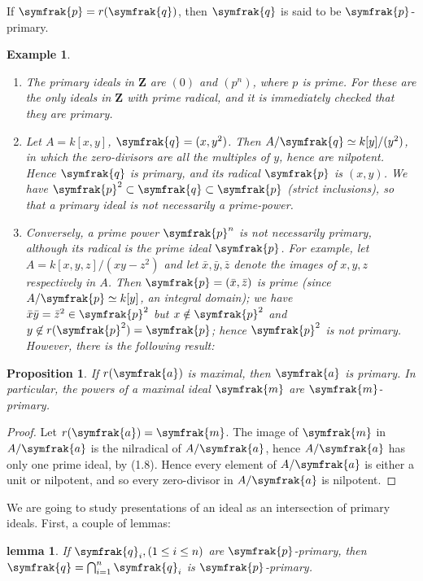 \documentclass{standalone}
\newtheorem{proposition}[theorem]{Proposition}
\newtheorem{lemma}[theorem]{lemma}
\newtheorem*{example}{Example}
\theoremstyle{definition}
\theoremstyle{remark}
\begin{document}
If $\symfrak{p}=r(\symfrak{q})$, then $\symfrak{q}$ is said to be
$\symfrak{p}$-primary.
\begin{example}
\begin{enumerate}
\item The primary ideals in $\mathbf{Z}$ are $(0)$ and $(p^n)$, where $p$ is prime. For
  these are the only ideals in $\mathbf{Z}$ with prime radical, and it is immediately checked
  that they are primary.
\item Let $A=k[x,y]$, $\symfrak{q} = (x, y^2)$. Then $A/\symfrak{q} \simeq
  k[y]/(y^2)$,
  in which the zero-divisors are all the multiples of $y$, hence are nilpotent.
  Hence $\symfrak{q}$ is primary, and its radical $\symfrak{p}$ is $(x, y)$. We
  have $\symfrak{p}^2\subset \symfrak{q}\subset \symfrak{p}$ (strict inclusions),
  so that a primary ideal is not necessarily a prime-power.
\item Conversely, a prime power $\symfrak{p}^n$ is not necessarily primary, although its
  radical is the prime ideal $\symfrak{p}$. For example, let $A = k[x, y, z]/(xy
  - z^2)$
  and let $\bar{x},\bar{y}, \bar{z}$ denote the images of $x, y, z$ respectively
  in $A$. Then $\symfrak{p} = (\bar{x}, \bar{z})$ is prime
  (since $A/\symfrak{p}\simeq k[y]$, an integral domain);
  we have $\bar{x}\bar{y} = \bar{z}^2\in \symfrak{p}^2$ but $x \notin
  \symfrak{p}^2$ and $y \not\in r(\symfrak{p}^2 ) = \symfrak{p}$;
  hence $\symfrak{p}^2$ is not primary. However, there is the following result:
\end{enumerate}
\end{example}
\begin{proposition}
  If $r(\symfrak{a})$ is maximal, then $\symfrak{a}$ is primary. In particular, the
  powers of a maximal ideal $\symfrak{m}$ are $\symfrak{m}$-primary.
\end{proposition}
\begin{proof}
  Let $r(\symfrak{a}) = \symfrak{m}$. The image of $\symfrak{m}$ in
  $A/\symfrak{a}$ is the nilradical of $A/\symfrak{a}$, hence $A/\symfrak{a}$ has only one prime ideal, by (1.8). Hence every element of $A/\symfrak{a}$ is either a unit or nilpotent, and so every zero-divisor in $A/\symfrak{a}$ is nilpotent.
\end{proof}
We are going to study presentations of an ideal as an intersection of primary
ideals. First, a couple of lemmas:
\begin{lemma}
  If $\symfrak{q}_i, (1 \le i \le n)$ are $\symfrak{p}$-primary, then $\symfrak{q} = \bigcap_{i=1}^{n}\symfrak{q}_i$ is $\symfrak{p}$-primary.
\end{lemma}
\end{document}
